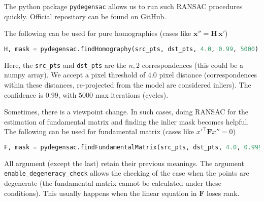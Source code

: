 The python package \texttt{pydegensac} allows us to run such RANSAC procedures quickly. Official repository can be found on \href{https://github.com/ducha-aiki/pydegensac}{GitHub}.

The following can be used for pure homographies (cases like $\mathbf{x}'' = \mathbf{H\, x}'$)

\begin{lstlisting}[language=Python]
    H, mask = pydegensac.findHomography(src_pts, dst_pts, 4.0, 0.99, 5000)
\end{lstlisting}

Here, the \texttt{src\_pts} and \texttt{dst\_pts} are the $n, 2$ correspondences (this could be a numpy array). We accept a pixel threshold of $4.0$ pixel distance (correspondences within these distances, re-projected from the model are considered inliers). The confidence is $0.99$, with $5000$ max iterations (cycles).

Sometimes, there is a viewpoint change. In such cases, doing RANSAC for the estimation of fundamental matrix and finding the inlier mask becomes helpful. The following can be used for fundamental matrix (cases like $x'^\top \mathbf{F} x'' = 0$)

\begin{lstlisting}[language=Python]
    F, mask = pydegensac.findFundamentalMatrix(src_pts, dst_pts, 4.0, 0.999, 10000, enable_degeneracy_check= True)
\end{lstlisting}

All argument (except the last) retain their previous meanings. The argument \texttt{enable\_degeneracy\_check} allows the checking of the case when the points are degenerate (the fundamental matrix cannot be calculated under these conditions). This usually happens when the linear equation in $\mathbf{F}$ loses rank.
